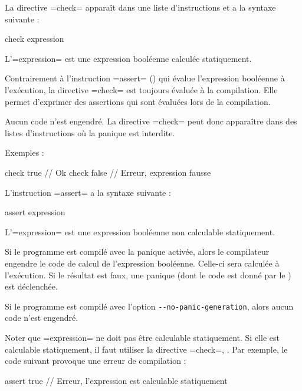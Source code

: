 
La directive \plm=check= apparaît dans une liste d'instructions et a la syntaxe suivante :
\begin{PLM}
check expression
\end{PLM}

L'\plm=expression= est une expression booléenne calculée statiquement.

Contrairement à l'instruction \plm=assert= () qui évalue l'expression booléenne à l'exécution, la directive \plm=check= est toujours évaluée à la compilation. Elle permet d'exprimer des assertions qui sont évaluées lors de la compilation.

Aucun code n'est engendré. La directive \plm=check= peut donc apparaître dans des listes d'instructions où la panique est interdite.

Exemples :
\begin{PLM}
check true  // Ok
check false // Erreur, expression fausse
\end{PLM}




L'instruction \plm=assert= a la syntaxe suivante :
\begin{PLM}
assert expression
\end{PLM}

L'\plm=expression= est une expression booléenne non calculable statiquement.

Si le programme est compilé avec la panique activée, alors le compilateur engendre le code de calcul de l'expression booléenne. Celle-ci sera calculée à l'exécution. Si le résultat est faux, une panique (dont le code est donné par le ) est déclenchée.

Si le programme est compilé avec l'option \texttt{-{}-no-panic-generation}, alors aucun code n'est engendré.

Noter que \plm=expression= ne doit pas être calculable statiquement. Si elle est calculable statiquement, il faut utiliser la directive \plm=check=, . Par exemple, le code suivant provoque une erreur de compilation :
\begin{PLM}
assert true // Erreur, l'expression est calculable statiquement
\end{PLM}



